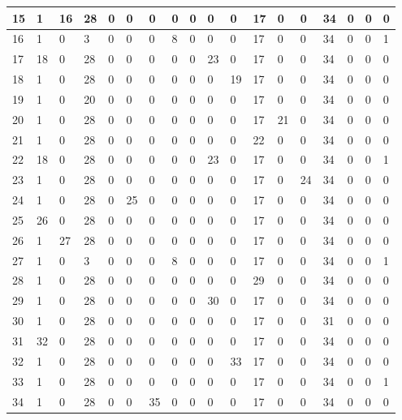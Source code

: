 \documentclass{article}
\begin{document}
\begin{table}[!htbp]
\begin{adjustbox}{max width=\textwidth}
\begin{tabular}{|l|l|l|l|l|l|l|l|l|l|l|l|l|l|l|l|l|l|}
            15 & 1 & 16 & 28 & 0 & 0 & 0 & 0 & 0 & 0 & 0 & 17 & 0 & 0 & 34 & 0 & 0 & 0 \\ \hline
            16 & 1 & 0 & 3 & 0 & 0 & 0 & 8 & 0 & 0 & 0 & 17 & 0 & 0 & 34 & 0 & 0 & 1 \\ \hline
            17 & 18 & 0 & 28 & 0 & 0 & 0 & 0 & 0 & 23 & 0 & 17 & 0 & 0 & 34 & 0 & 0 & 0 \\ \hline
            18 & 1 & 0 & 28 & 0 & 0 & 0 & 0 & 0 & 0 & 19 & 17 & 0 & 0 & 34 & 0 & 0 & 0 \\ \hline
            19 & 1 & 0 & 20 & 0 & 0 & 0 & 0 & 0 & 0 & 0 & 17 & 0 & 0 & 34 & 0 & 0 & 0 \\ \hline
            20 & 1 & 0 & 28 & 0 & 0 & 0 & 0 & 0 & 0 & 0 & 17 & 21 & 0 & 34 & 0 & 0 & 0 \\ \hline
            21 & 1 & 0 & 28 & 0 & 0 & 0 & 0 & 0 & 0 & 0 & 22 & 0 & 0 & 34 & 0 & 0 & 0 \\ \hline
            22 & 18 & 0 & 28 & 0 & 0 & 0 & 0 & 0 & 23 & 0 & 17 & 0 & 0 & 34 & 0 & 0 & 1 \\ \hline
            23 & 1 & 0 & 28 & 0 & 0 & 0 & 0 & 0 & 0 & 0 & 17 & 0 & 24 & 34 & 0 & 0 & 0 \\ \hline
            24 & 1 & 0 & 28 & 0 & 25 & 0 & 0 & 0 & 0 & 0 & 17 & 0 & 0 & 34 & 0 & 0 & 0 \\ \hline
            25 & 26 & 0 & 28 & 0 & 0 & 0 & 0 & 0 & 0 & 0 & 17 & 0 & 0 & 34 & 0 & 0 & 0 \\ \hline
            26 & 1 & 27 & 28 & 0 & 0 & 0 & 0 & 0 & 0 & 0 & 17 & 0 & 0 & 34 & 0 & 0 & 0 \\ \hline
            27 & 1 & 0 & 3 & 0 & 0 & 0 & 8 & 0 & 0 & 0 & 17 & 0 & 0 & 34 & 0 & 0 & 1 \\ \hline
            28 & 1 & 0 & 28 & 0 & 0 & 0 & 0 & 0 & 0 & 0 & 29 & 0 & 0 & 34 & 0 & 0 & 0 \\ \hline
            29 & 1 & 0 & 28 & 0 & 0 & 0 & 0 & 0 & 30 & 0 & 17 & 0 & 0 & 34 & 0 & 0 & 0 \\ \hline
            30 & 1 & 0 & 28 & 0 & 0 & 0 & 0 & 0 & 0 & 0 & 17 & 0 & 0 & 31 & 0 & 0 & 0 \\ \hline
            31 & 32 & 0 & 28 & 0 & 0 & 0 & 0 & 0 & 0 & 0 & 17 & 0 & 0 & 34 & 0 & 0 & 0 \\ \hline
            32 & 1 & 0 & 28 & 0 & 0 & 0 & 0 & 0 & 0 & 33 & 17 & 0 & 0 & 34 & 0 & 0 & 0 \\ \hline
            33 & 1 & 0 & 28 & 0 & 0 & 0 & 0 & 0 & 0 & 0 & 17 & 0 & 0 & 34 & 0 & 0 & 1 \\ \hline
            34 & 1 & 0 & 28 & 0 & 0 & 35 & 0 & 0 & 0 & 0 & 17 & 0 & 0 & 34 & 0 & 0 & 0 \\ \hline

\end{tabular}
\end{adjustbox}
\end{table}
\end{document}
